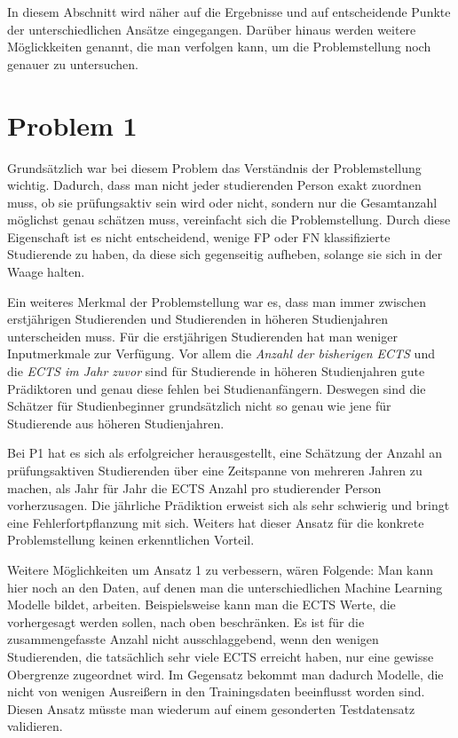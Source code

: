 In diesem Abschnitt wird näher auf die Ergebnisse und auf entscheidende Punkte der unterschiedlichen Ans\"atze eingegangen.
Dar\"uber hinaus werden weitere M\"oglickkeiten genannt, die man verfolgen kann, um die Problemstellung noch genauer zu untersuchen.






\section{Problem 1}

Grunds\"atzlich war bei diesem Problem das Verst\"andnis der Problemstellung wichtig. Dadurch, dass man nicht jeder studierenden Person exakt zuordnen muss,
ob sie pr\"ufungsaktiv sein wird oder nicht, sondern nur die Gesamtanzahl m\"oglichst genau sch\"atzen muss, vereinfacht sich die Problemstellung.
Durch diese Eigenschaft ist es nicht entscheidend, wenige FP oder FN klassifizierte Studierende zu haben, da diese sich gegenseitig aufheben, solange sie sich in der
Waage halten.

Ein weiteres Merkmal der Problemstellung war es, dass man immer zwischen erstj\"ahrigen Studierenden und Studierenden in h\"oheren Studienjahren unterscheiden muss.
F\"ur die erstj\"ahrigen Studierenden hat man weniger Inputmerkmale zur Verf\"ugung. Vor allem die \textit{Anzahl der bisherigen ECTS} und die \textit{ECTS im Jahr zuvor} sind f\"ur
Studierende in h\"oheren Studienjahren gute Pr\"adiktoren und genau diese fehlen bei Studienanf\"angern. Deswegen sind die Sch\"atzer f\"ur Studienbeginner grunds\"atzlich
nicht so genau wie jene f\"ur Studierende aus h\"oheren Studienjahren.

Bei P1 hat es sich als erfolgreicher herausgestellt, eine Sch\"atzung der Anzahl an pr\"ufungsaktiven Studierenden \"uber eine Zeitspanne von mehreren
Jahren zu machen, als Jahr f\"ur Jahr die ECTS Anzahl pro studierender Person vorherzusagen. Die j\"ahrliche Pr\"adiktion erweist sich als
sehr schwierig und bringt eine Fehlerfortpflanzung mit sich. Weiters hat dieser Ansatz f\"ur die konkrete Problemstellung keinen erkenntlichen Vorteil.

Weitere M\"oglichkeiten um Ansatz 1 zu verbessern, w\"aren Folgende: Man kann hier noch an den Daten, auf denen man die unterschiedlichen Machine Learning
Modelle bildet, arbeiten. Beispielsweise kann man die ECTS Werte, die vorhergesagt werden sollen, nach oben beschr\"anken. Es ist f\"ur die
zusammengefasste Anzahl nicht ausschlaggebend, wenn den wenigen Studierenden, die tats\"achlich sehr viele ECTS erreicht haben, nur eine gewisse Obergrenze zugeordnet wird.
Im Gegensatz bekommt man dadurch Modelle, die nicht von wenigen Ausrei{\ss}ern in den Trainingsdaten beeinflusst worden sind. Diesen Ansatz m\"usste man wiederum
auf einem gesonderten Testdatensatz validieren.

